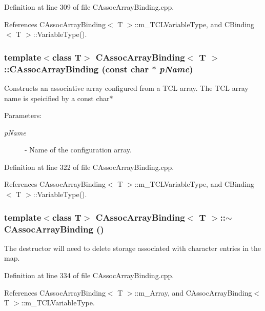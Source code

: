 Definition at line 309 of file CAssoc\-Array\-Binding.cpp.

References CAssoc\-Array\-Binding$<$ T $>$::m\_\-TCLVariable\-Type, and CBinding$<$ T $>$::Variable\-Type().
\subsubsection{\setlength{\rightskip}{0pt plus 5cm}template$<$class T$>$ CAssoc\-Array\-Binding$<$ T $>$::CAssoc\-Array\-Binding (const char $\ast$ {\em p\-Name})}\label{classCAssocArrayBinding_a1}


Constructs an associative array configured from a TCL array. The TCL array name is speicified by a const char$\ast$ \begin{Desc}
\item[Parameters: ]\par
\begin{description}
\item[{\em 
p\-Name}]- Name of the configuration array. \end{description}
\end{Desc}


Definition at line 322 of file CAssoc\-Array\-Binding.cpp.

References CAssoc\-Array\-Binding$<$ T $>$::m\_\-TCLVariable\-Type, and CBinding$<$ T $>$::Variable\-Type().
\subsubsection{\setlength{\rightskip}{0pt plus 5cm}template$<$class T$>$ CAssoc\-Array\-Binding$<$ T $>$::$\sim$CAssoc\-Array\-Binding ()}\label{classCAssocArrayBinding_a2}


The destructor will need to delete storage associated with character entries in the map. 

Definition at line 334 of file CAssoc\-Array\-Binding.cpp.

References CAssoc\-Array\-Binding$<$ T $>$::m\_\-Array, and CAssoc\-Array\-Binding$<$ T $>$::m\_\-TCLVariable\-Type.

